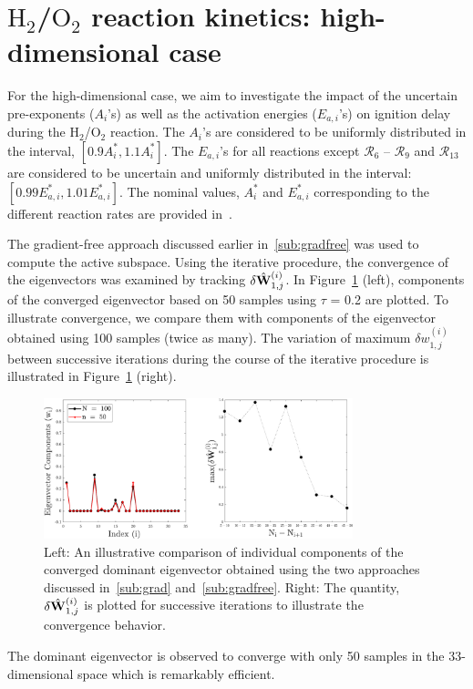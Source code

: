 \section{$\text{H}_2$/$\text{O}_2$ reaction kinetics: high-dimensional case}
\label{sec:app}

For the high-dimensional case, we aim to investigate the impact of the uncertain
pre-exponents ($A_i$'s) as well as the activation energies ($E_{a,i}$'s) on ignition 
delay during the H$_2$/O$_2$ reaction. The $A_i$'s are considered to be uniformly
distributed in the interval, $[0.9A_i^\ast, 1.1A_i^\ast]$. The $E_{a,i}$'s for all
reactions except $\mathcal{R}_6$ -- $\mathcal{R}_9$ and $\mathcal{R}_{13}$
are considered to be uncertain and uniformly distributed in the interval: 
$[0.99E_{a,i}^\ast, 1.01E_{a,i}^\ast]$. The nominal values, $A_i^\ast$ and $E_{a,i}^\ast$
corresponding to the different reaction rates are provided in~\cite{Yetter:1991}. 

The gradient-free approach discussed earlier in~\ref{sub:gradfree} was used to compute the
active subspace. Using the iterative procedure, the convergence of the eigenvectors
was examined by tracking $\delta \hat{\mathbf{{W}}}_{1,j}^{(i)}$. In Figure~\ref{fig:conv_app} (left),
components of the converged eigenvector based on 50 samples using $\tau$ = 0.2 are plotted.
To illustrate convergence, we compare them with components of the eigenvector obtained
using 100 samples (twice as many). The variation of maximum $\delta w_{1,j}^{(i)}$ between
successive iterations during the course of the iterative procedure is illustrated in 
Figure~\ref{fig:conv_app} (right). 
%
\begin{figure}[htbp]
 \begin{center}
  \includegraphics[width=0.8\textwidth]{./Figures/eigv10}
\caption{Left: An illustrative comparison of individual components of the converged dominant eigenvector obtained
using the two approaches discussed in~\ref{sub:grad} and~\ref{sub:gradfree}. Right: The quantity,  
$\delta \hat{\mathbf{{W}}}_{1,j}^{(i)}$
is plotted for successive iterations to illustrate the convergence behavior.}
\label{fig:conv_app}
\end{center}
\end{figure}
%
The dominant eigenvector is observed to converge with only 50 samples in the 33-dimensional space which
is remarkably efficient. 

